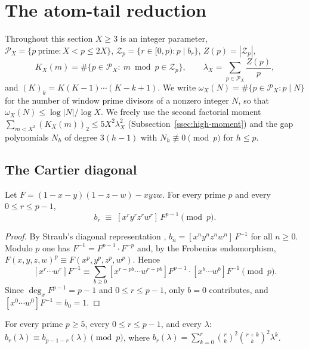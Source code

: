 
\section{The atom-tail reduction}
\label{sec:atom-tail}

Throughout this section $X\ge 3$ is an integer parameter,
$\mathcal P_X=\{p\ \text{prime}:X<p\le2X\}$,
$\mathcal Z_p=\{r\in[0,p):p\mid b_r\}$, $Z(p)=|\mathcal Z_p|$,
\[
  K_X(m)=\#\{p\in\mathcal P_X:\ m\bmod p\in\mathcal Z_p\},
  \qquad
  \lambda_X=\sum_{p\in\mathcal P_X}\frac{Z(p)}p ,
\]
and $(K)_k=K(K-1)\cdots(K-k+1)$.  We write
$\omega_X(N)=\#\{p\in\mathcal P_X:p\mid N\}$ for the number of
window prime divisors of a nonzero integer $N$, so that
$\omega_X(N)\le\log|N|/\log X$.  We freely use the second
factorial moment $\sum_{m<X^2}(K_X(m))_2\le5X^2\lambda_X^2$
(Subsection~\ref{ssec:high-moment}) and the gap polynomials
$N_h$ of degree $3(h-1)$ with $N_h\not\equiv0\pmod p$ for
$h\le p$.

\subsection{The Cartier diagonal}

\begin{theorem}\label{thm:atomtail-cartier}
Let $F=(1-x-y)(1-z-w)-xyzw$.  For every prime $p$ and every
$0\le r\le p-1$,
\[
  b_r\;\equiv\;[x^ry^rz^rw^r]\,F^{p-1}\pmod p .
\]
\end{theorem}

\begin{proof}
By Straub's diagonal representation \cite{Straub2014},
$b_n=[x^ny^nz^nw^n]\,F^{-1}$ for all $n\ge0$.
Modulo $p$ one has $F^{-1}=F^{p-1}\cdot F^{-p}$ and, by the
Frobenius endomorphism, $F(x,y,z,w)^p\equiv F(x^p,y^p,z^p,w^p)$.
Hence
\[
 [x^r\!\cdots w^r]F^{-1}
 \equiv\sum_{b\ge0}[x^{r-pb}\!\cdots w^{r-pb}]F^{p-1}\cdot
 [x^b\!\cdots w^b]F^{-1}\pmod p .
\]
Since $\deg_xF^{p-1}=p-1$ and $0\le r\le p-1$, only $b=0$
contributes, and $[x^0\cdots w^0]F^{-1}=b_0=1$.
\end{proof}

\begin{corollary}
\label{cor:atomtail-palindrome-lambda}
For every prime $p \ge 5$, every $0 \le r \le p-1$,
and every $\lambda$:
$b_r(\lambda) \equiv b_{p-1-r}(\lambda) \pmod{p}$,
where $b_r(\lambda) = \sum_{k=0}^r \binom{r}{k}^2\binom{r+k}{k}^2 \lambda^k$.
\end{corollary}

